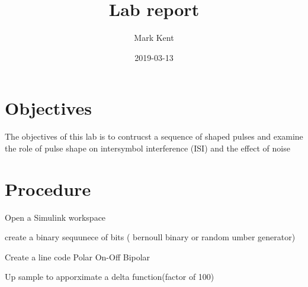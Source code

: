 \documentclass{article}
\title{Lab report}
\date{2019-03-13}
\author{Mark Kent}
\begin{document}
\section{Objectives}
\indent
The objectives of this lab is to contrucst a sequence of shaped pulses and
examine the role of pulse shape on intersymbol interference (ISI) and the effect
of noise

\section{Procedure}

Open a Simulink workspace

create a binary sequunece of bits ( bernoull binary or random umber generator)

Create a line code
  Polar
  On-Off
  Bipolar

  Up sample to apporximate a delta function(factor of 100)
\end{document}
